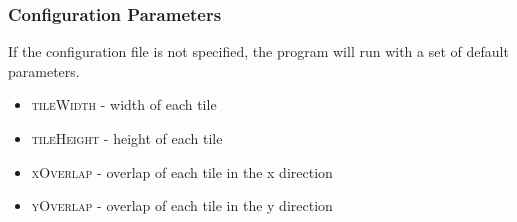 \subsubsection{Configuration Parameters}
If the configuration file is not specified, the program will run with a set of default parameters.
\begin{itemize}
	\item{\textsc{tileWidth}} - width of each tile
	\item{\textsc{tileHeight}} - height of each tile
	\item{\textsc{xOverlap}} - overlap of each tile in the x direction
	\item{\textsc{yOverlap}} - overlap of each tile in the y direction
\end{itemize}



